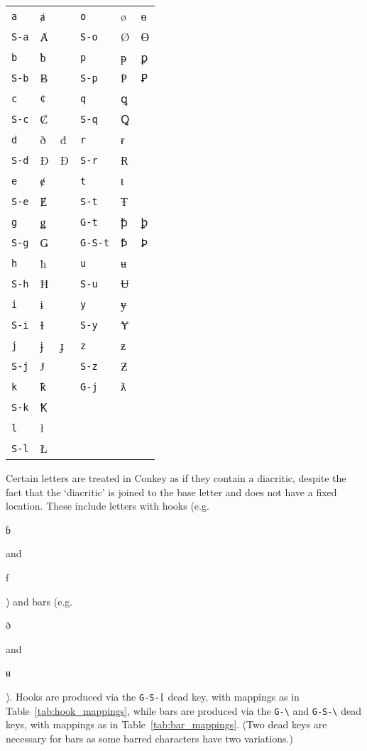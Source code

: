 \documentclass[oneside]{memoir}
\newcommand{\key}{\verb}
\newcommand{\out}[1]{\colorbox{gray!20}{\strut{}#1}}
\begin{document}
\begin{table}
\begin{minipage}{0.55\paperwidth}
\begin{tabular}{lll@{\hspace{1cm}}lll}
\midrule
\key|a|   & ⱥ &   & \key|o|     & ø & ɵ \\
\key|S-a| & Ⱥ &   & \key|S-o|   & Ø & Ɵ \\
\key|b|   & ƀ &   & \key|p|     & ᵽ & ꝑ \\
\key|S-b| & Ƀ &   & \key|S-p|   & Ᵽ & Ꝑ \\
\key|c|   & ȼ &   & \key|q|     & ꝗ &   \\
\key|S-c| & Ȼ &   & \key|S-q|   & Ꝗ &   \\
\key|d|   & ð & đ & \key|r|     & ɍ &   \\
\key|S-d| & Ð & Đ & \key|S-r|   & Ɍ &   \\
\key|e|   & ɇ &   & \key|t|     & ŧ &   \\
\key|S-e| & Ɇ &   & \key|S-t|   & Ŧ &   \\
\key|g|   & ǥ &   & \key|G-t|   & ꝥ & ꝧ \\
\key|S-g| & Ǥ &   & \key|G-S-t| & Ꝥ & Ꝧ \\
\key|h|   & ħ &   & \key|u|     & ʉ & \\
\key|S-h| & Ħ &   & \key|S-u|   & Ʉ & \\
\key|i|   & ɨ &   & \key|y|     & ɏ & \\
\key|S-i| & Ɨ &   & \key|S-y|   & Ɏ & \\
\key|j|   & ɉ & ɟ & \key|z|     & ƶ & \\
\key|S-j| & Ɉ &   & \key|S-z|   & Ƶ & \\
\key|k|   & ꝁ &   & \key|G-j|   & ƛ & \\
\key|S-k| & Ꝁ &   &             &   & \\
\key|l|   & ł &   &             &   & \\
\key|S-l| & Ł &   &             &   & \\
\bottomrule
\end{tabular}
\end{minipage}
\end{table}

Certain letters are treated in Conkey as if they contain a diacritic,
  despite the fact that the `diacritic' is joined to the base letter and does not have a fixed location.
These include letters with hooks (e.g.\ \out{ɓ} and \out{ƒ}) and bars (e.g.\ \out{ð} and \out{ʉ}).
Hooks are produced via the \key|G-S-[| dead key, with mappings as in Table~\ref{tab:hook_mappings},
  while bars are produced via the \key|G-\| and \key|G-S-\| dead keys, with mappings as in Table~\ref{tab:bar_mappings}.
(Two dead keys are necessary for bars as some barred characters have two variations.)
\end{document}

